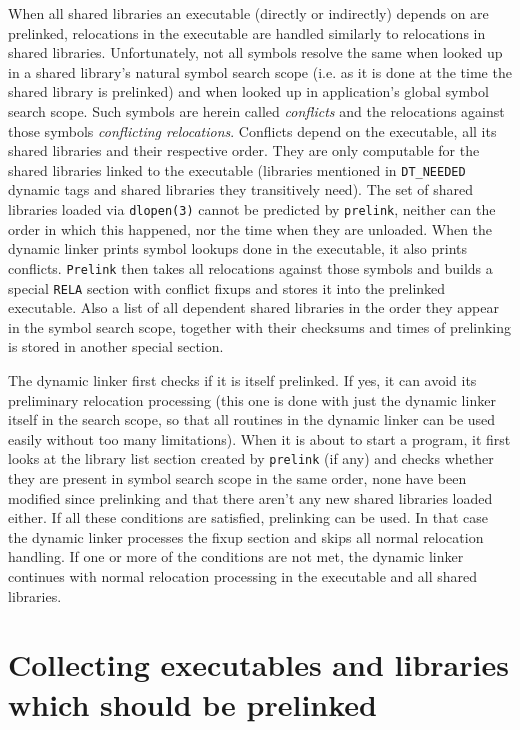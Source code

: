 \documentclass[twoside]{article}
\def\tts#1{\texttt{\small #1}}
\begin{document}
When all shared libraries an executable (directly or indirectly) depends on
are prelinked, relocations in the executable are handled similarly to
relocations in shared libraries.  Unfortunately, not all symbols resolve the
same when looked up in a shared library's natural symbol search scope
(i.e. as it is done at the time the shared library is prelinked) and when
looked up in application's global symbol search scope.  Such symbols are
herein called {\sl conflicts} and the relocations against those symbols
{\sl conflicting relocations}.  Conflicts depend on the executable, all its
shared libraries and their respective order.  They are only computable
for the shared libraries linked to the executable (libraries mentioned in
\tts{DT\_NEEDED} dynamic tags and shared libraries they transitively need).
The set of shared libraries loaded via \tts{dlopen(3)} cannot be predicted
by \tts{prelink}, neither can the order in which this happened, nor the time
when they are unloaded.  When the dynamic linker prints symbol lookups
done in the executable, it also prints conflicts.  \tts{Prelink} then
takes all relocations against those symbols and builds a special
\tts{RELA} section with conflict fixups and stores it into the
prelinked executable.  Also a list of all dependent shared libraries
in the order they appear in the symbol search scope, together
with their checksums and times of prelinking is stored in another special
section.

The dynamic linker first checks if it is itself prelinked.  If yes,
it can avoid its preliminary relocation processing (this one is done
with just the dynamic linker itself in the search scope, so that
all routines in the dynamic linker can be used easily without too many
limitations).  When it is about to start a program, it first looks
at the library list section created by \tts{prelink} (if any) and
checks whether they are present in symbol search scope in the same
order, none have been modified since prelinking and that there aren't any
new shared libraries loaded either.  If all these conditions are
satisfied, prelinking can be used.  In that case the dynamic linker
processes the fixup section and skips all normal relocation handling.
If one or more of the conditions are not met, the dynamic linker continues
with normal relocation processing in the executable and all shared libraries.

\section{Collecting executables and libraries which should be prelinked}
\end{document}
